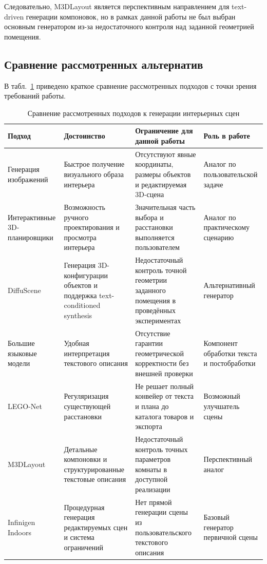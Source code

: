 \documentclass[times]{itmo-student-thesis}
\begin{document}
Следовательно, M3DLayout является перспективным направлением для text-driven генерации компоновок, но в рамках данной работы не был выбран основным генератором из-за недостаточного контроля над заданной геометрией помещения.

\subsection{Сравнение рассмотренных альтернатив}

В табл.~\ref{tab:scene_generation_methods_comparison} приведено краткое сравнение рассмотренных подходов с точки зрения требований работы.

\begin{table}[h]
\centering
\caption{Сравнение рассмотренных подходов к генерации интерьерных сцен}
\label{tab:scene_generation_methods_comparison}
\begin{tabular}{|p{}|p{}|p{}|p{}|}
\hline
\textbf{Подход} & \textbf{Достоинство} & \textbf{Ограничение для данной работы} & \textbf{Роль в работе} \\
\hline
Генерация изображений & Быстрое получение визуального образа интерьера & Отсутствуют явные координаты, размеры объектов и редактируемая 3D-сцена & Аналог по пользовательской задаче \\
\hline
Интерактивные 3D-планировщики & Возможность ручного проектирования и просмотра интерьера & Значительная часть выбора и расстановки выполняется пользователем & Аналог по практическому сценарию \\
\hline
DiffuScene & Генерация 3D-конфигурации объектов и поддержка text-conditioned synthesis & Недостаточный контроль точной геометрии заданного помещения в проведённых экспериментах & Альтернативный генератор \\
\hline
Большие языковые модели & Удобная интерпретация текстового описания & Отсутствие гарантии геометрической корректности без внешней проверки & Компонент обработки текста и постобработки \\
\hline
LEGO-Net & Регуляризация существующей расстановки & Не решает полный конвейер от текста и плана до каталога товаров и экспорта & Возможный улучшатель сцены \\
\hline
M3DLayout & Детальные компоновки и структурированные текстовые описания & Недостаточный контроль точных параметров комнаты в доступной реализации & Перспективный аналог \\
\hline
Infinigen Indoors & Процедурная генерация редактируемых сцен и система ограничений & Нет прямой генерации сцены из пользовательского текстового описания & Базовый генератор первичной сцены \\
\hline
\end{tabular}
\end{table}
\end{document}
